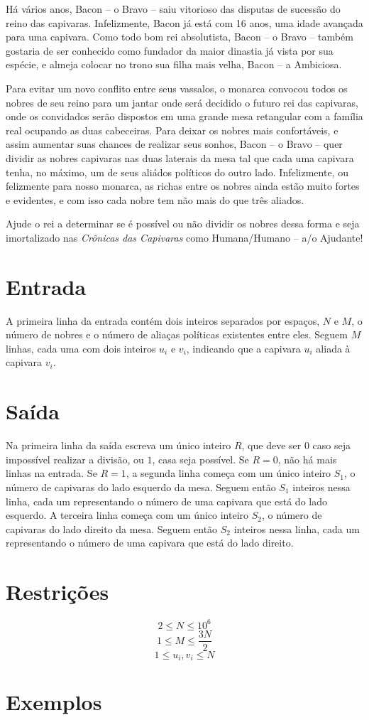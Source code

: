 Há vários anos, Bacon -- o Bravo -- saiu vitorioso das disputas de sucessão do reino das capivaras.
Infelizmente, Bacon já está com 16 anos, uma idade avançada para uma capivara.
Como todo bom rei absolutista, Bacon -- o Bravo -- também gostaria de ser conhecido como fundador
da maior dinastia já vista por sua espécie, e almeja colocar no trono sua filha mais velha,
Bacon -- a Ambiciosa.

Para evitar um novo conflito entre seus vassalos, o monarca convocou todos os nobres de seu reino
para um jantar onde será decidido o futuro rei das capivaras, onde os convidados serão dispostos em uma
grande mesa retangular com a família real ocupando as duas cabeceiras.
Para deixar os nobres mais confortáveis, e assim aumentar suas chances de realizar seus sonhos,
Bacon -- o Bravo -- quer dividir as nobres capivaras nas duas laterais da mesa tal que cada uma capivara tenha,
no máximo, um de seus aliádos políticos do outro lado.
Infelizmente, ou felizmente para nosso monarca, as richas entre os nobres ainda estão muito fortes e evidentes,
e com isso cada nobre tem não mais do que três aliados.

Ajude o rei a determinar se é possível ou não dividir os nobres dessa forma e seja imortalizado nas 
\textit{Crônicas das Capivaras} como Humana/Humano -- a/o Ajudante!

\section*{Entrada}

A primeira linha da entrada contém dois inteiros separados por espaços, $N$ e $M$, o número de nobres e o número
de aliaças políticas existentes entre eles.
Seguem $M$ linhas, cada uma com dois inteiros $u_i$ e $v_i$, indicando que a capivara $u_i$ aliada à capivara $v_i$.

\section*{Saída}

Na primeira linha da saída escreva um único inteiro $R$, que deve ser $0$ caso seja impossível realizar a divisão,
ou $1$, casa seja possível.
Se $R = 0$, não há mais linhas na entrada.
Se $R = 1$, a segunda linha começa com um único inteiro $S_1$, o número de capivaras do lado esquerdo da mesa.
Seguem então $S_1$ inteiros nessa linha, cada um representando o número de uma capivara que está do lado esquerdo.
A terceira linha começa com um único inteiro $S_2$, o número de capivaras do lado direito da mesa.
Seguem então $S_2$ inteiros nessa linha, cada um representando o número de uma capivara que está do lado direito.


\section*{Restrições}

$$2 \leq N \leq 10^{6}$$
$$1 \leq M \leq \frac{3N}{2}$$
$$1 \leq u_i, v_i \leq N$$

\section*{Exemplos}
\exemplo
